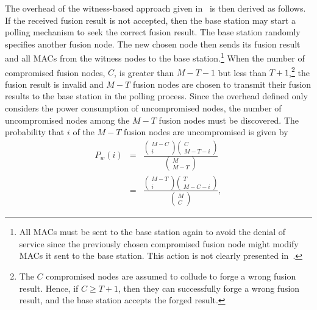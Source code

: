 \documentclass[12pt, onecolumn, draftcls]{IEEEtran}
\begin{document}
The overhead of the witness-based approach given
in~\cite{du:assurance} is then derived as follows. If the received
fusion result is not accepted, then the base station may start a
polling mechanism to seek the correct fusion result. The base
station randomly specifies another fusion node. The new chosen node
then sends its fusion result and all MACs from the witness nodes to
the base station.\footnote{All MACs must be sent to the base station
again to avoid the denial of service since the previously chosen
compromised fusion node might modify MACs it sent to the base
station. This action is not clearly presented
in~\cite{du:assurance}.} When the number of compromised fusion
nodes, $C$, is greater than $M-T-1$ but less than
$T+1$,\footnote{The $C$ compromised nodes are assumed to collude to
forge a wrong fusion result. Hence, if $C \ge T+1$, then they can
successfully forge a wrong fusion result, and the base station
accepts the forged result.} the fusion result is invalid and $M-T$
fusion nodes are chosen to transmit their fusion results to the base
station in the polling process. Since the overhead defined only
considers the power consumption of uncompromised nodes, the number
of uncompromised nodes among the $M-T$ fusion nodes must be
discovered. The probability that $i$ of the $M-T$ fusion nodes are
uncompromised is given by \setlength{\arraycolsep}{0.0em}
\begin{eqnarray*}
P_w(i)&{}={}&\frac{\left(\begin{array}{c} M-C \\
i
\end{array}\right) \left(\begin{array}{c} C \\M-T-i
\end{array}\right)} {\left(\begin{array}{c} M \\ M-T
\end{array}\right)} \\
&{}={}&\frac{\left(\begin{array}{c} M-T \\
i
\end{array}\right) \left(\begin{array}{c} T \\M-C-i
\end{array}\right)} {\left(\begin{array}{c} M \\ C
\end{array}\right)},
\end{eqnarray*}
\end{document}
